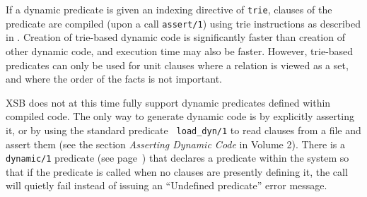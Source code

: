 
If a dynamic predicate is given an indexing directive of {\tt trie},
clauses of the predicate are compiled (upon a call {\tt assert/1})
using trie instructions as described in \cite{RRSSW98}.  Creation of
trie-based dynamic code is significantly faster than creation of other
dynamic code, and execution time may also be faster.  However,
trie-based predicates can only be used for unit clauses where a
relation is viewed as a set, and where the order of the facts is not
important.

XSB does not at this time fully support dynamic predicates defined
within compiled code.  The only way to generate dynamic code is by
explicitly asserting it, or by using the standard predicate {\tt
  load\_dyn/1} to read clauses from a file and assert them (see the
section {\it Asserting Dynamic Code} in Volume 2).  There is a {\tt
  dynamic/1} predicate (see page~\pageref{dynamic/1}) that declares a
predicate within the system so that if the predicate is called when no
clauses are presently defining it, the call will quietly fail instead
of issuing an {\sf ``Undefined predicate''} error message.

